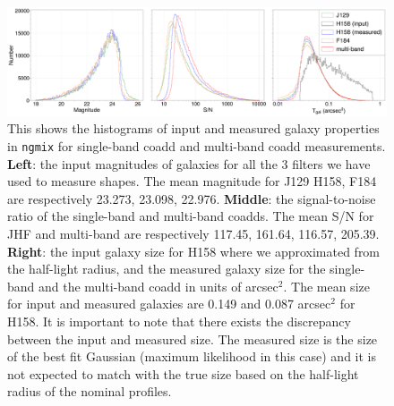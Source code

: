 \documentclass[fleqn,usenatbib]{mnras}
\begin{document}
\begin{figure}
    \centering
	\includegraphics[width=\textwidth]{true_ngmix_measured_properties_pplt.pdf}
    \caption{This shows the histograms of input and measured galaxy properties in \texttt{ngmix} for single-band coadd and multi-band coadd measurements. \textbf{Left}: the input magnitudes of galaxies for all the 3 filters we have used to measure shapes. The mean magnitude for J129 H158, F184 are respectively 23.273, 23.098, 22.976. \textbf{Middle}: the signal-to-noise ratio of the single-band and multi-band coadds. The mean S/N for JHF and multi-band are respectively 117.45, 161.64, 116.57, 205.39. \textbf{Right}: the input galaxy size for H158 where we approximated from the half-light radius, and the measured galaxy size for the single-band and the multi-band coadd in units of arcsec$^2$. The mean size for input and measured galaxies are 0.149 and 0.087 arcsec$^2$ for H158. It is important to note that there exists the discrepancy between the input and measured size. The measured size is the size of the best fit Gaussian (maximum likelihood in this case) and it is not expected to match with the true size based on the half-light radius of the nominal profiles.}
    \label{fig:ngmix_measured_properties}
\end{figure}

\end{document}
